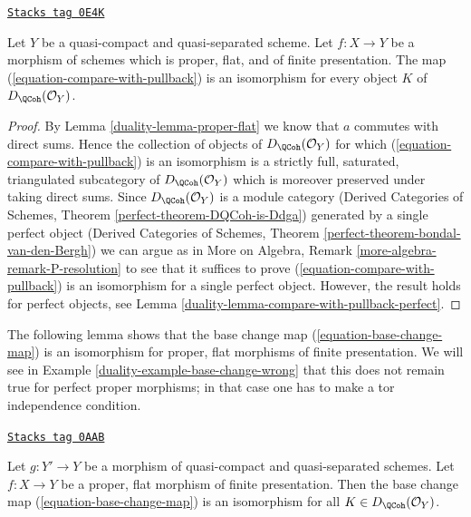\begin{lemma}
\label{duality-lemma-compare-with-pullback-flat-proper}
\href{https://stacks.math.columbia.edu/tag/0E4K}{\texttt{Stacks tag 0E4K}}

Let $Y$ be a quasi-compact and quasi-separated scheme.
Let $f : X \to Y$ be a morphism of schemes which is proper, flat, and
of finite presentation.
The map (\ref{equation-compare-with-pullback}) is an isomorphism
for every object $K$ of $D_\QCoh(\mathcal{O}_Y)$.
\end{lemma}

\begin{proof}

By Lemma \ref{duality-lemma-proper-flat} we know that $a$ commutes
with direct sums. Hence the collection of objects of
$D_\QCoh(\mathcal{O}_Y)$ for which (\ref{equation-compare-with-pullback})
is an isomorphism is a strictly full, saturated, triangulated
subcategory of $D_\QCoh(\mathcal{O}_Y)$ which is moreover
preserved under taking direct sums. Since $D_\QCoh(\mathcal{O}_Y)$
is a module category (Derived Categories of Schemes, Theorem
\ref{perfect-theorem-DQCoh-is-Ddga}) generated by a single
perfect object (Derived Categories of Schemes, Theorem
\ref{perfect-theorem-bondal-van-den-Bergh})
we can argue as in
More on Algebra, Remark \ref{more-algebra-remark-P-resolution}
to see that it suffices to prove (\ref{equation-compare-with-pullback})
is an isomorphism for a single perfect object.
However, the result holds for perfect objects, see
Lemma \ref{duality-lemma-compare-with-pullback-perfect}.
\end{proof}

The following lemma shows that the base change map
(\ref{equation-base-change-map}) is an isomorphism
for proper, flat morphisms of finite presentation.
We will see in
Example \ref{duality-example-base-change-wrong}
that this does not remain true for perfect proper morphisms;
in that case one has to make a tor independence condition.

\begin{lemma}
\label{duality-lemma-proper-flat-base-change}
\href{https://stacks.math.columbia.edu/tag/0AAB}{\texttt{Stacks tag 0AAB}}

Let $g : Y' \to Y$ be a morphism of quasi-compact and quasi-separated schemes.
Let $f : X \to Y$ be a proper, flat morphism of finite presentation.
Then the base change map (\ref{equation-base-change-map}) is an isomorphism
for all $K \in D_\QCoh(\mathcal{O}_Y)$.
\end{lemma}

